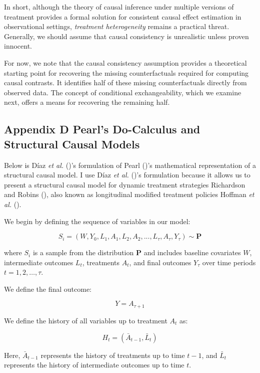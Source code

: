 \documentclass[
  single column]{article}
\begin{document}
In short, although the theory of causal inference under multiple
versions of treatment provides a formal solution for consistent causal
effect estimation in observational settings, \emph{treatment
heterogeneity} remains a practical threat. Generally, we should assume
that causal consistency is unrealistic unless proven innocent.

For now, we note that the causal consistency assumption provides a
theoretical starting point for recovering the missing counterfactuals
required for computing causal contrasts. It identifies half of these
missing counterfactuals directly from observed data. The concept of
conditional exchangeability, which we examine next, offers a means for
recovering the remaining half.

\newpage{}

\subsection{Appendix D Pearl's Do-Calculus and Structural Causal
Models}\label{id-app-d}

Below is Díaz \emph{et al.} ()'s
formulation of Pearl ()'s mathematical
representation of a structural causal model. I use Díaz \emph{et al.}
()'s formulation because it allows us to
present a structural causal model for dynamic treatment strategies
Richardson and Robins (), also known
as longitudinal modified treatment policies Hoffman \emph{et al.}
().

We begin by defining the sequence of variables in our model:

\[
S_i= (W, Y_0, L_1, A_1, L_2, A_2, ..., L_\tau, A_\tau, Y_{\tau}) \sim \mathbf{P}
\]

where \(S_i\) is a sample from the distribution \(\mathbf{P}\) and
includes baseline covariates \(W\), intermediate outcomes \(L_t\),
treatments \(A_t\), and final outcomes \(Y_{\tau}\) over time periods
\(t = 1, 2, \ldots, \tau\).

We define the final outcome:

\[
Y = A_{\tau + 1}
\]

We define the history of all variables up to treatment \(A_t\) as:

\[
H_t = (\bar{A}_{t-1}, \bar{L}_t)
\]

Here, \(\bar{A}_{t-1}\) represents the history of treatments up to time
\(t-1\), and \(\bar{L}_t\) represents the history of intermediate
outcomes up to time \(t\).
\end{document}
